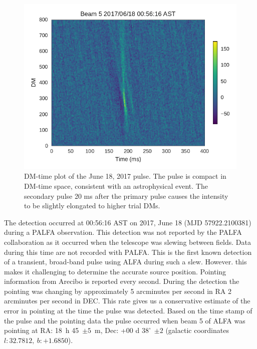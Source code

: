 \documentclass[a4paper,fleqn,usenatbib]{mnras}
\begin{document}
\begin{figure}
    \includegraphics[width=1.0\linewidth]{figures/Beam5_fb_D20170618T005616_buffer2_dmspace.pdf}
    \caption{DM-time plot of the June 18, 2017 pulse. The pulse is compact in
    DM-time space, consistent with an astrophysical event. The secondary pulse
    20 ms after the primary pulse causes the intensity to be slightly elongated
    to higher trial DMs.
    }
    \label{fig:D20170618_dmspace}
\end{figure}

The detection occurred at 00:56:16 AST on 2017, June 18 (MJD
57922.2100381) during a PALFA observation. This detection was not
reported by the PALFA collaboration as it occurred when the telescope
was slewing between fields. Data during this time are not recorded
with PALFA. This is the first known detection of a transient,
broad-band pulse using ALFA during such a slew. However. this makes it
challenging to determine the accurate source position. Pointing
information from Arecibo is reported every second.  During the
detection the pointing was changing by approximately 5 arcminutes per
second in RA 2 arcminutes per second in DEC. This rate gives us a
conservative estimate of the error in pointing at the time the pulse
was detected. Based on the time stamp of the pulse and the pointing
data the pulse occurred when beam 5 of ALFA was pointing at RA: 18~h
45~$\pm 5$~m, Dec: +00 d 38'~$\pm 2$ (galactic coordinates $l: 32.7812, ~b:
+1.6850$).

\end{document}
